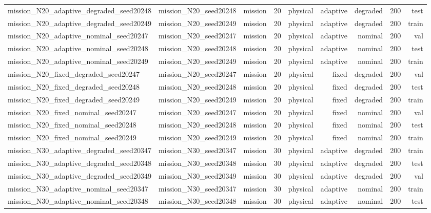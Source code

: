 \begin{tabular}{lrrrrrrrr}
mission\_N20\_adaptive\_degraded\_seed20248 & mission\_N20\_seed20248 & mission & 20 & physical & adaptive & degraded & 200 & test \\
mission\_N20\_adaptive\_degraded\_seed20249 & mission\_N20\_seed20249 & mission & 20 & physical & adaptive & degraded & 200 & train \\
mission\_N20\_adaptive\_nominal\_seed20247 & mission\_N20\_seed20247 & mission & 20 & physical & adaptive & nominal & 200 & val \\
mission\_N20\_adaptive\_nominal\_seed20248 & mission\_N20\_seed20248 & mission & 20 & physical & adaptive & nominal & 200 & test \\
mission\_N20\_adaptive\_nominal\_seed20249 & mission\_N20\_seed20249 & mission & 20 & physical & adaptive & nominal & 200 & train \\
mission\_N20\_fixed\_degraded\_seed20247 & mission\_N20\_seed20247 & mission & 20 & physical & fixed & degraded & 200 & val \\
mission\_N20\_fixed\_degraded\_seed20248 & mission\_N20\_seed20248 & mission & 20 & physical & fixed & degraded & 200 & test \\
mission\_N20\_fixed\_degraded\_seed20249 & mission\_N20\_seed20249 & mission & 20 & physical & fixed & degraded & 200 & train \\
mission\_N20\_fixed\_nominal\_seed20247 & mission\_N20\_seed20247 & mission & 20 & physical & fixed & nominal & 200 & val \\
mission\_N20\_fixed\_nominal\_seed20248 & mission\_N20\_seed20248 & mission & 20 & physical & fixed & nominal & 200 & test \\
mission\_N20\_fixed\_nominal\_seed20249 & mission\_N20\_seed20249 & mission & 20 & physical & fixed & nominal & 200 & train \\
mission\_N30\_adaptive\_degraded\_seed20347 & mission\_N30\_seed20347 & mission & 30 & physical & adaptive & degraded & 200 & train \\
mission\_N30\_adaptive\_degraded\_seed20348 & mission\_N30\_seed20348 & mission & 30 & physical & adaptive & degraded & 200 & test \\
mission\_N30\_adaptive\_degraded\_seed20349 & mission\_N30\_seed20349 & mission & 30 & physical & adaptive & degraded & 200 & val \\
mission\_N30\_adaptive\_nominal\_seed20347 & mission\_N30\_seed20347 & mission & 30 & physical & adaptive & nominal & 200 & train \\
mission\_N30\_adaptive\_nominal\_seed20348 & mission\_N30\_seed20348 & mission & 30 & physical & adaptive & nominal & 200 & test \\

\end{tabular}
